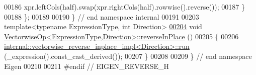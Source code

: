 \begin{DoxyCode}
00186     xpr.leftCols(half).swap(xpr.rightCols(half).rowwise().reverse());
00187   \}
00188 \};
00189 
00190 \} \textcolor{comment}{// end namespace internal}
00191 
00203 \textcolor{keyword}{template}<\textcolor{keyword}{typename} ExpressionType, \textcolor{keywordtype}{int} Direction>
\hyperlink{group___core___module_ab9dd7c273eb2ba8defaab2d55156936b}{00204} \textcolor{keywordtype}{void} \hyperlink{group___core___module_ab9dd7c273eb2ba8defaab2d55156936b}{VectorwiseOp<ExpressionType,Direction>::reverseInPlace}
      ()
00205 \{
00206   \hyperlink{struct_eigen_1_1internal_1_1vectorwise__reverse__inplace__impl}{internal::vectorwise\_reverse\_inplace\_impl<Direction>::run}
      (\_expression().const\_cast\_derived());
00207 \}
00208 
00209 \} \textcolor{comment}{// end namespace Eigen}
00210 
00211 \textcolor{preprocessor}{#endif // EIGEN\_REVERSE\_H}
\end{DoxyCode}
